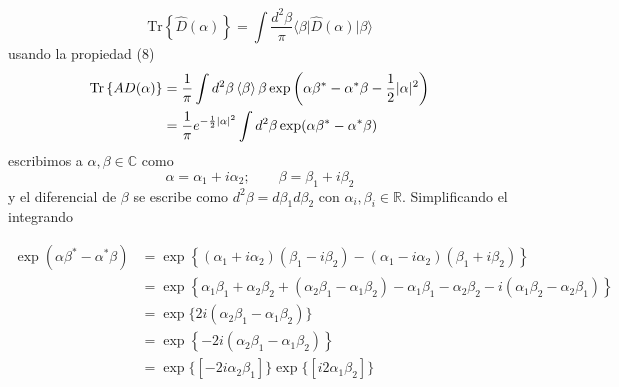 \begin{enumerate}
        \begin{equation*}
          \mathrm{Tr}\left\{\hat{D}(\alpha) \right\} = \int \frac{d^2\beta}{\pi}\langle \beta \vert \hat{D}(\alpha) \vert \beta \rangle
        \end{equation*}
        usando la propiedad (8)
        \begin{align*}
          \mathrm{Tr}\left\{ A{D}(\alpha) \right\} & = \frac{1}{\pi}\int d^2\beta \braket{\beta}{\beta}\exp{\left( \alpha\beta^* - \alpha^*\beta - \frac{1}{2}|\alpha|^2 \right)} \\
                                                      & = \frac{1}{\pi}e^{-\frac{1}{2}|\alpha|^2} \int d^2\beta \exp(\alpha\beta^* - \alpha^*\beta)
        \end{align*}
        escribimos a $\alpha,\beta \in \mathbb{C} $ como
        \begin{equation*}
          \alpha = \alpha_1 + i\alpha_2;\qquad \beta = \beta_1 + i\beta_2
        \end{equation*}
        y el diferencial de $\beta$ se escribe como $d^2\beta = d\beta_1 d\beta_2$ con $\alpha_i, \beta_i \in \mathbb{R}$. Simplificando el integrando

        \begin{align*}
          \exp(\alpha\beta^* - \alpha^*\beta) & = \exp\left\{ (\alpha_1 + i\alpha_2)(\beta_1 - i\beta_2) - (\alpha_1 - i\alpha_2)(\beta_1 + i\beta_2) \right\}                                                          \\
                                              & = \exp\left\{\alpha_1\beta_1 + \alpha_2\beta_2 + (\alpha_2\beta_1 - \alpha_1\beta_2) - \alpha_1\beta_1 - \alpha_2\beta_2 - i(\alpha_1\beta_2 - \alpha_2\beta_1)\right\} \\
                                              & = \exp\{ 2i(\alpha_2\beta_1 - \alpha_1\beta_2) \}                                                                                                                       \\
                                              & = \exp\left\{ -2i(\alpha_{2}\beta_{1} - \alpha_{1}\beta_{2}) \right\}                                                                                                   \\
                                              & = \exp\{[-2i\alpha_2\beta_1]\}\exp\{[i2\alpha_1\beta_2]\}
        \end{align*}




\end{enumerate}
